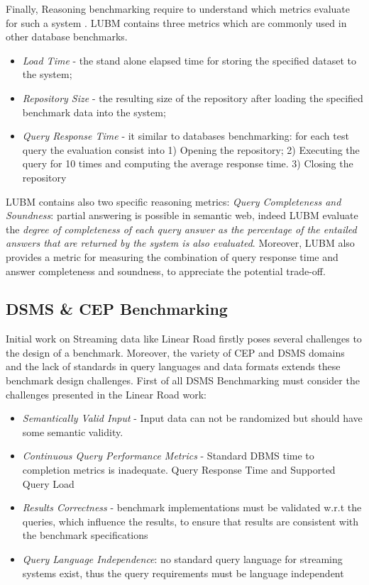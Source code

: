 Finally, Reasoning benchmarking require to understand which metrics evaluate for such a system \cite{Guo2005}. LUBM contains three metrics which are commonly used in other database benchmarks.\begin{itemize}
\item \textit{Load Time} - the stand alone elapsed time for storing the specified dataset to the system;
\item \textit{Repository Size} -  the resulting size of the repository after loading the specified benchmark data into the system;
\item \textit{Query Response Time} - it similar to databases benchmarking: for each test query the evaluation consist into
  	1) Opening the repository; 2) Executing the query for 10 times and computing the average response time. 3) Closing the repository
\end{itemize}

LUBM contains also two specific reasoning metrics: \textit{Query Completeness and Soundness}: partial answering is possible in semantic web, indeed LUBM evaluate the \textit{degree of completeness of each query answer as the percentage of the entailed answers that are returned by the system is also evaluated}. Moreover, LUBM also provides a metric for measuring the combination of  query response time and answer completeness and soundness, to  appreciate the potential trade-off.

\subsection{DSMS \& CEP Benchmarking}\label{sec:linear-road}

Initial work on Streaming data like Linear Road \cite{arasu2004linear} firstly poses  several challenges to the design of a benchmark.  Moreover, the variety of CEP and DSMS domains and the lack of standards in query languages and data formats extends these benchmark design challenges. First of all DSMS Benchmarking must consider the challenges presented in the Linear Road work:
\begin{itemize}
\item  \textit{Semantically Valid Input} -  Input data can not be randomized but should have some semantic validity.
\item  \textit{Continuous Query Performance Metrics} - Standard DBMS time to completion metrics is inadequate. Query Response Time and Supported Query Load 
\item  \textit{Results Correctness} - benchmark implementations must be validated w.r.t the queries, which influence the results, to ensure that results are consistent with the benchmark specifications 
\item  \textit{Query Language Independence}: no standard query language for streaming systems exist, thus the query requirements must be language independent
\end{itemize}

